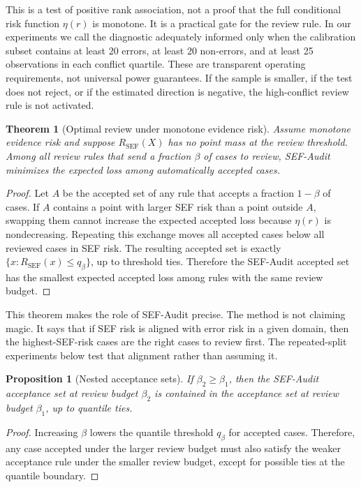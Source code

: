 \documentclass[11pt]{article}
\newtheorem{theorem}{Theorem}
\newtheorem{proposition}{Proposition}
\begin{document}
This is a test of positive rank association, not a proof that the full conditional risk function $\eta(r)$ is monotone. It is a practical gate for the review rule. In our experiments we call the diagnostic adequately informed only when the calibration subset contains at least 20 errors, at least 20 non-errors, and at least 25 observations in each conflict quartile. These are transparent operating requirements, not universal power guarantees. If the sample is smaller, if the test does not reject, or if the estimated direction is negative, the high-conflict review rule is not activated.

\begin{theorem}[Optimal review under monotone evidence risk]
Assume monotone evidence risk and suppose $R_{\mathrm{SEF}}(X)$ has no point mass at the review threshold. Among all review rules that send a fraction $\beta$ of cases to review, SEF-Audit minimizes the expected loss among automatically accepted cases.
\end{theorem}

\begin{proof}
Let $A$ be the accepted set of any rule that accepts a fraction $1-\beta$ of cases. If $A$ contains a point with larger SEF risk than a point outside $A$, swapping them cannot increase the expected accepted loss because $\eta(r)$ is nondecreasing. Repeating this exchange moves all accepted cases below all reviewed cases in SEF risk. The resulting accepted set is exactly $\{x:R_{\mathrm{SEF}}(x)\leq q_\beta\}$, up to threshold ties. Therefore the SEF-Audit accepted set has the smallest expected accepted loss among rules with the same review budget.
\end{proof}

This theorem makes the role of SEF-Audit precise. The method is not claiming magic. It says that if SEF risk is aligned with error risk in a given domain, then the highest-SEF-risk cases are the right cases to review first. The repeated-split experiments below test that alignment rather than assuming it.

\begin{proposition}[Nested acceptance sets]
If $\beta_2\geq\beta_1$, then the SEF-Audit acceptance set at review budget $\beta_2$ is contained in the acceptance set at review budget $\beta_1$, up to quantile ties.
\end{proposition}

\begin{proof}
Increasing $\beta$ lowers the quantile threshold $q_\beta$ for accepted cases. Therefore, any case accepted under the larger review budget must also satisfy the weaker acceptance rule under the smaller review budget, except for possible ties at the quantile boundary.
\end{proof}
\end{document}
